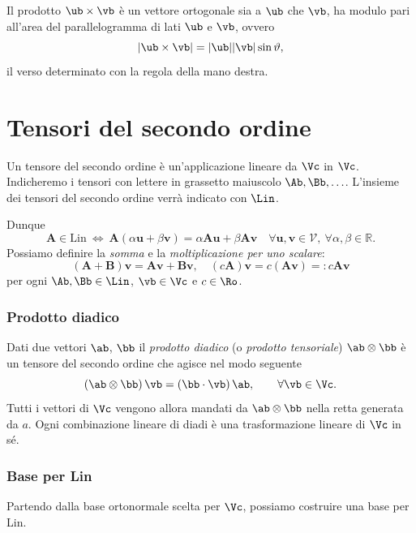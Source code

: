 Il prodotto $\ub\times \vb$ è un vettore ortogonale sia a $\ub$ che $\vb$, ha modulo pari all'area del parallelogramma di lati $\ub$ e $\vb$, ovvero 
\begin{equation}
|\ub \times \vb|=|\ub||\vb|\sin\vartheta,
\end{equation}
il verso determinato con la regola della mano destra.

\section{Tensori del secondo ordine}
Un tensore del secondo ordine è un'applicazione lineare da $\Vc$ in $\Vc$. Indicheremo i tensori con lettere in  grassetto maiuscolo $\Ab, \Bb, \ldots$. L'insieme dei tensori del secondo ordine verrà indicato con $\Lin$.

Dunque
\begin{equation}
	\mathbf{A}\in\mathrm{Lin~}\Longleftrightarrow\mathbf{~A}(\alpha\mathbf{u}+\beta\mathbf{v})=\alpha\mathbf{A}\mathbf{u}+\beta\mathbf{A}\mathbf{v}\quad\forall\mathbf{u},\mathbf{v}\in\mathcal{V},\mathrm{~}\forall \alpha, \beta\in\mathbb{R}.
\end{equation}
Possiamo definire  la \textit{somma} e la \textit{moltiplicazione per uno scalare}:
\begin{equation}
	(\mathbf{A}+\mathbf{B})\mathbf{v}=\mathbf{A}\mathbf{v}+\mathbf{B}\mathbf{v},\quad(c\mathbf{A})\mathbf{v}=c(\mathbf{A}\mathbf{v})=:c\mathbf{A}\mathbf{v}
\end{equation}
per ogni $\Ab, \Bb \in \Lin$, $\vb \in \Vc$ e $c\in \Ro$.

\subsubsection{Prodotto diadico}
Dati due vettori $\ab$, $\bb$ il \textit{prodotto diadico} (o \textit{prodotto tensoriale}) $\ab \otimes \bb$ è un tensore del secondo ordine che agisce nel modo seguente
\begin{equation}
(\ab \otimes \bb)\,\vb =(\bb \cdot \vb)\,\ab, \qquad \forall \vb \in \Vc.
\end{equation}
Tutti i vettori di $\Vc$ vengono allora mandati da $\ab \otimes \bb$ nella retta generata da $a$.
Ogni combinazione lineare di diadi è una trasformazione lineare di $\Vc$ in sé. 

\subsubsection{Base per Lin}
Partendo dalla base ortonormale scelta per $\Vc$, possiamo costruire una base per Lin.

